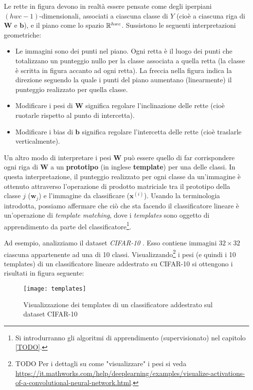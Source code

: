 Le rette in figura devono in realtà essere pensate come degli iperpiani $(hwc-1)$-dimensionali, associati a ciascuna classe di $Y$ (cioè a ciascuna riga di $\mathbf{W}$ e $\mathbf{b}$), e il piano come lo spazio $\mathbb{R}^{hwc}$. Sussistono le seguenti interpretazioni geometriche:
\begin{itemize}
\item Le immagini sono dei punti nel piano. Ogni retta è il luogo dei punti che totalizzano un punteggio nullo per la classe associata a quella retta (la classe è scritta in figura accanto ad ogni retta). La freccia nella figura indica la direzione seguendo la quale i punti del piano aumentano (linearmente) il punteggio realizzato per quella classe.
\item Modificare i pesi di $\mathbf{W}$ significa regolare l'inclinazione delle rette (cioè ruotarle rispetto al punto di intercetta).
\item Modificare i bias di $\mathbf{b}$ significa regolare l'intercetta delle rette (cioè traslarle verticalmente).
\end{itemize}

Un altro modo di interpretare i pesi $\mathbf{W}$ può essere quello di far corrispondere ogni riga di $\mathbf{W}$ a un \textbf{prototipo} (in inglese \textbf{template}) per una delle classi. In questa interpretazione, il punteggio realizzato per ogni classe da un'immagine è ottenuto attraverso l'operazione di prodotto matriciale tra il prototipo della classe $j$ ($\mathbf{w}_j$) e l'immagine da classificare ($\mathbf{x}^{(i)}$).
Usando la terminologia introdotta, possiamo affermare che ciò che sta facendo il classificatore lineare è un'operazione di \textit{template matching}, dove i \textit{templates} sono oggetto di apprendimento da parte del classificatore\footnote{Si introdurranno gli algoritmi di apprendimento (supervisionato) nel capitolo \ref{TODO}.}.

Ad esempio, analizziamo il dataset \textit{CIFAR-10} \cite{cifar10}. Esso contiene immagini $32\times 32$ ciascuna appartenente ad una di 10 classi. Visualizzando\footnote{TODO Per i dettagli su come "visualizzare" i pesi si veda \url{https://it.mathworks.com/help/deeplearning/examples/visualize-activations-of-a-convolutional-neural-network.html}.} i pesi (e quindi i 10 templates) di un classificatore lineare addestrato su CIFAR-10 si ottengono i risultati in figura seguente:

\begin{figure}[h]
\centering
\texttt{[image: templates]}
\caption{Visualizzazione dei templates di un classificatore addestrato sul dataset CIFAR-10}
\label{templates}
\end{figure}

